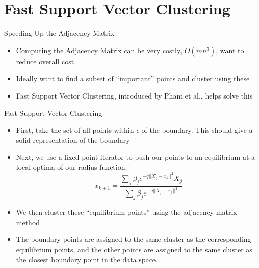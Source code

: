 \documentclass{beamer}
\begin{document}
\section{Fast Support Vector Clustering}
\begin{frame}{Speeding Up the Adjacency Matrix}
    \begin{itemize}
        \item Computing the Adjacency Matrix can be very costly, $O(mn^3)$, want to reduce overall cost
        \item Ideally want to find a subset of ``important'' points and cluster using these
        \item Fast Support Vector Clustering\cite{Pham2017}, introduced by Pham et al., helps solve this
    \end{itemize}
\end{frame}
\begin{frame}{Fast Support Vector Clustering}
\begin{itemize}
    \item First, take the set of all points within $\epsilon$ of the boundary. This should give a solid representation of the boundary
    \item Next, we use a fixed point iterator to push our points to an equilibrium at a local optima of our radius function. \[x_{k+1} = \frac{\sum_j \beta_j e^{-q||X_j - x_k||^2} X_j}{\sum_j \beta_j e^{-q||X_j - x_k||^2}}\]
    \item We then cluster these ``equilibrium points'' using the adjacency matrix method
    \item The boundary points are assigned to the same cluster as the corresponding equilibrium points, and the other points are assigned to the same cluster as the closest boundary point in the data space.
\end{itemize}
\end{frame}
\end{document}
